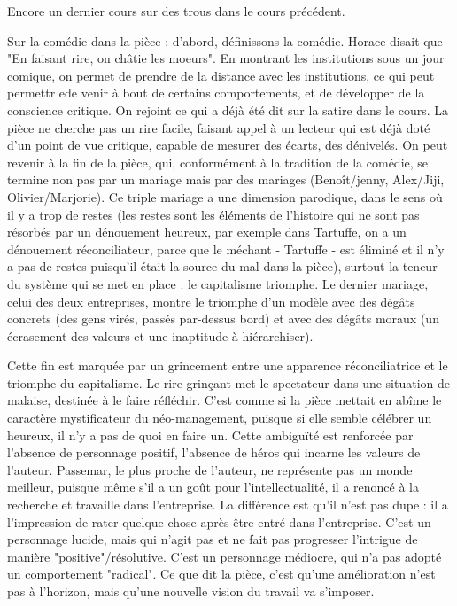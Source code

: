 \documentclass[a4paper,12pt]{book}
\begin{document}
\par Encore un dernier cours sur des trous dans le cours précédent.
\par Sur la comédie dans la pièce : d'abord, définissons la comédie. Horace disait que "En faisant rire, on châtie les moeurs". En montrant les institutions sous un jour comique, on permet de prendre de la distance avec les institutions, ce qui peut permettr ede venir à bout de certains comportements, et de développer de la conscience critique. On rejoint ce qui a déjà été dit sur la satire dans le cours. La pièce ne cherche pas un rire facile, faisant appel à un lecteur qui est déjà doté d'un point de vue critique, capable de mesurer des écarts, des dénivelés. On peut revenir à la fin de la pièce, qui, conformément à la tradition de la comédie, se termine non pas par un mariage mais par des mariages (Benoît/jenny, Alex/Jiji, Olivier/Marjorie). Ce triple mariage a une dimension parodique, dans le sens où il y a trop de restes (les restes sont les éléments de l'histoire qui ne sont pas résorbés par un dénouement heureux, par exemple dans Tartuffe, on a un dénouement réconciliateur, parce que le méchant - Tartuffe - est éliminé et il n'y a pas de restes puisqu'il était la source du mal dans la pièce), surtout la teneur du système qui se met en place : le capitalisme triomphe. Le dernier mariage, celui des deux entreprises, montre le triomphe d'un modèle avec des dégâts concrets (des gens virés, passés par-dessus bord) et avec des dégâts moraux (un écrasement des valeurs et une inaptitude à hiérarchiser).
\par Cette fin est marquée par un grincement entre une apparence réconciliatrice et le triomphe du capitalisme. Le rire grinçant met le spectateur dans une situation de malaise, destinée à le faire réfléchir. C'est comme si la pièce mettait en abîme le caractère mystificateur du néo-management, puisque si elle semble célébrer un heureux, il n'y a pas de quoi en faire un. Cette ambiguïté est renforcée par l'absence de personnage positif, l'absence de héros qui incarne les valeurs de l'auteur. Passemar, le plus proche de l'auteur, ne représente pas un monde meilleur, puisque même s'il a un goût pour l'intellectualité, il a renoncé à la recherche et travaille dans l'entreprise. La différence est qu'il n'est pas dupe : il a l'impression de rater quelque chose après être entré dans l'entreprise. C'est un personnage lucide, mais qui n'agit pas et ne fait pas progresser l'intrigue de manière "positive"/résolutive. C'est un personnage médiocre, qui n'a pas adopté un comportement "radical". Ce que dit la pièce, c'est qu'une amélioration n'est pas à l'horizon, mais qu'une nouvelle vision du travail va s'imposer.
\end{document}
